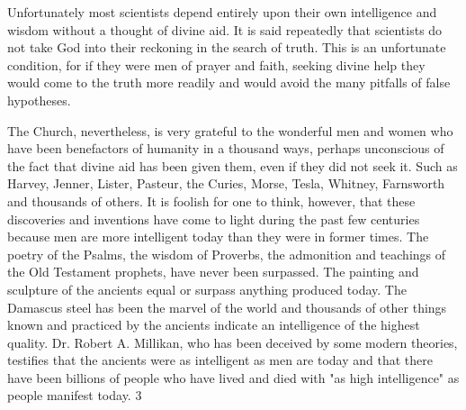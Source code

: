 Unfortunately most scientists depend entirely upon their own intelligence and wisdom
without a thought of divine aid. It is said repeatedly that scientists do not take God into their
reckoning in the search of truth. This is an unfortunate condition, for if they were men of
prayer and faith, seeking divine help they would come to the truth more readily and would
avoid the many pitfalls of false hypotheses.

The Church, nevertheless, is very grateful to the wonderful men and women who have been
benefactors of humanity in a thousand ways, perhaps unconscious of the fact that divine aid
has been given them, even if they did not seek it. Such as Harvey, Jenner, Lister, Pasteur, the
Curies, Morse, Tesla, Whitney, Farnsworth and thousands of others. It is foolish for one to
think, however, that these discoveries and inventions have come to light during the past few
centuries because men are more intelligent today than they were in former times. The poetry
of the Psalms, the wisdom of Proverbs, the admonition and teachings of the Old Testament
prophets, have never been surpassed. The painting and sculpture of the ancients equal or
surpass anything produced today. The Damascus steel has been the marvel of the world and
thousands of other things known and practiced by the ancients indicate an intelligence of the
highest quality. Dr. Robert A. Millikan, who has been deceived by some modern theories,
testifies that the ancients were as intelligent as men are today and that there have been
billions of people who have lived and died with "as high intelligence" as people manifest
today. 3

